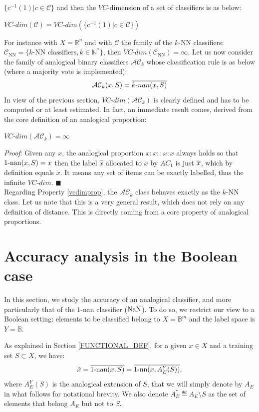 $\{c^{-1}(1) | c \in \mathcal{C}\}$ and then the $VC\mbox{-}$dimension of a set of classifiers is as below:
\begin{definition}
$VC\mbox{-}dim(\mathcal{C})=VC\mbox{-}dim(\{c^{-1}(1) | c \in \mathcal{C}\})$
\end{definition}
For instance with $X=\mathbb{R}^n$ and with $\mathcal{C}$ the family of the $k$-NN
classifiers: $\mathcal{C}_{\text{NN}}=\{ k\text{-NN classifiers}, k \in \mathbb{N}^*\}$,
then $VC\mbox{-}dim(\mathcal{C}_{\text{NN}})=\infty$.
Let us now consider the family of analogical binary classifiers $\mathcal{AC}_k$ whose classification rule is as below (where a majority vote is implemented):
$$\mathcal{AC}_k(x,S) = \overline{k\mbox{-}nan(x,S)}$$
In view of the previous section, $VC\mbox{-}dim(\mathcal{AC}_k)$ is clearly defined and has to be computed
or at least estimated.
In fact, an immediate result comes, derived from the core definition of an analogical proportion:
\begin{property}\label{vcdimprop}
$VC\mbox{-}dim(\mathcal{AC}_k) = \infty$
\end{property}
{\it Proof}: Given any $x$, the analogical proportion $x:x::x:x$ always
holds so that $1\mbox{-nan}(x,S)=x$ then the label $\hat{x}$ allocated to $x$ by $AC_1$
is just $\overline{x}$, which by definition equals $\dot{x}$. It means any set of items can be
exactly labelled, thus the infinite $VC\mbox{-}dim$.  \hfill $\blacksquare$\\
Regarding Property \ref{vcdimprop}, the $\mathcal{AC}_k$ class
behaves exactly as the $k\mbox{-NN}$ class.
Let us note that this is a very general result, which does not rely on any definition of distance.
This is directly coming from a core property of analogical proportions.

\section{Accuracy analysis in the Boolean case}\label{accuracy}

In this section, we study the accuracy of an analogical classifier, and more
particularly that of the $1$-nan classifier ($\mbox{NaN}$). To do so, we restrict
our view to a Boolean setting: elements to be classified belong to
$X=\mathbb{B}^m$ and the label space is $Y = \mathbb{B}$.

As explained in Section \ref{FUNCTIONAL_DEF}, for a given $x \in X$ and a training set
$S \subset X$, we have:
\begin{equation}\label{eq1}
\hat{x}=\overline{1\mbox{-nan}(x, S)}=\overline{1\mbox{-nn}(x, A_E^Y(S))},
\end{equation}
where $A_E^Y(S)$ is the analogical extension of $S$, that we will simply denote
by $A_E$ in what follows for notational brevity.  We also denote $A_E^*
\eqdef A_E \setminus S$ as the set of elements that belong $A_E$ but not to
$S$.

